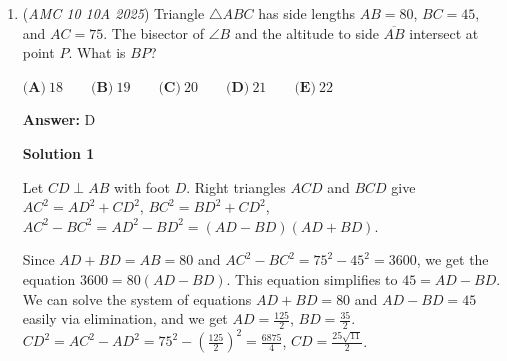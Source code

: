 \begin{enumerate}
 



\textbf{Solution 9 (More in depth of Solution 4)}

Let $r$ be the radius of the center circle. We wish to find the value of $r$.First, connect the centers of the circles with radius 1 and radius 2, radius 1 and radius 3, and radius 2 and radius 3. This forms a triangle with sides 3, 4, and 5. Note that $3^2 + 4^2 = 5^2$. By the converse of the Pythagorean theorem, this is a right triangle. So the area of this triangle is $\frac{(3)(4)}{2} = 6$. Now draw the radii from the center circle connecting to all of the other 3 circle centers. This forms 3 triangles, which we can find the area of in terms of $r$ with Heron's Formula.

 Triangle 1: This triangle has sides $r+1, r+2, 3$. The area of this triangle is $\sqrt{(r+3)(2)(1)(r)}$.

 Triangle 2: This triangle has sides $r+1, r+3, 4$. The area of this triangle is $\sqrt{(r+4)(3)(1)(r)}$

 Triangle 3: This triangle has sides $r+2, r+3, 5$. The area of this triangle is $\sqrt{(r+5)(3)(2)(r)}$

 Since these three triangles make up the area of the whole triangles, we have the equation $\sqrt{(r+3)(2)(1)(r)} + \sqrt{(r+4)(3)(1)(r)} + \sqrt{(r+5)(3)(2)(r)} = 6$. Now instead of solving this disgusting equation, we can just plug in the answer choices given. Checking all of them gives $r = \boxed{\textbf{(B)}\frac{6}{23}}$, which is our final answer.

 


 


	\item (\textit{AMC 10 10A 2025}) Triangle $\triangle ABC$ has side lengths $AB = 80$, $BC = 45$, and $AC = 75$. The bisector of $\angle B$ and the altitude to side $\overline{AB}$ intersect at point $P.$ What is $BP$?


 $\textbf{(A)}~18\qquad\textbf{(B)}~19\qquad\textbf{(C)}~20\qquad\textbf{(D)}~21\qquad\textbf{(E)}~22$

 \textbf{Answer: }D



\textbf{Solution 1}

Let $CD \perp AB$ with foot $D$. Right triangles $ACD$ and $BCD$ give $AC^2 = AD^2+CD^2$, $BC^2 = BD^2+CD^2$, $AC^2-BC^2 = AD^2-BD^2 =(AD-BD)(AD+BD)$. 

 Since $AD+BD = AB = 80$ and $AC^2-BC^2 = 75^2-45^2 = 3600$, we get the equation $3600 = 80(AD-BD)$. This equation simplifies to $45 = AD - BD$. We can solve the system of equations $AD + BD = 80$ and $AD - BD = 45$ easily via elimination, and we get $AD = \frac{125}{2}$, $BD = \frac{35}{2}$. $CD^2 = AC^2-AD^2 = 75^2-\left(\frac{125}{2}\right)^2 = \frac{6875}{4}$, $CD = \frac{25\sqrt{11}}{2}$. 


\end{enumerate}
